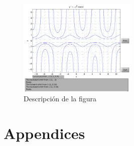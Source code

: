 \documentclass[10pt,a4paper]{article}
\begin{document}


\begin{figure}[h]
    \centering
    \includegraphics[width=0.5\textwidth]{fig2.pdf}
    \caption{Descripción de la figura}
\end{figure}

\appendix
{}
\section*{Appendices}


\end{document}
